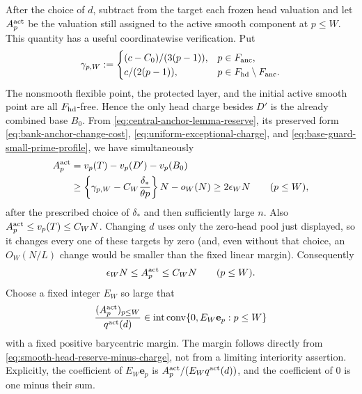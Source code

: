 \documentclass[11pt]{article}
\numberwithin{equation}{section}
\theoremstyle{definition}
\theoremstyle{remark}
\newcommand{\1}{\mathbf 1}
\begin{document}
After the choice of \(d\), subtract from the target each frozen head
valuation and let \(A_p^{\rm act}\) be the valuation still assigned to
the active smooth component at \(p\leq W\).  This quantity has a useful
coordinatewise verification.  Put
\[
 \gamma_{p,W}:=
 \begin{cases}
 (c-C_0)/(3(p-1)),&p\in F_{\rm anc},\\
 c/(2(p-1)),&p\in F_{\rm hd}\setminus F_{\rm anc}.
 \end{cases}
\]
The nonsmooth flexible point, the protected layer, and the initial active
smooth point are all \(F_{\rm hd}\)-free.  Hence the only head charge
besides \(D'\) is the already combined base \(B_0\).  From
\eqref{eq:central-anchor-lemma-reserve}, its preserved form
\eqref{eq:bank-anchor-change-cost},
\eqref{eq:uniform-exceptional-charge}, and
\eqref{eq:base-guard-small-prime-profile}, we have simultaneously
\begin{equation}
 \begin{split}
 A_p^{\rm act}
 &=v_p(T)-v_p(D')-v_p(B_0)\\
 &\geq\left\{\gamma_{p,W}
       -C_W\frac{\delta_*}{\theta p}\right\}N
       -o_W(N)\geq 2\epsilon_WN
       \qquad(p\leq W),
 \end{split}
 \label{eq:smooth-head-reserve-minus-charge}
\end{equation}
after the prescribed choice of \(\delta_*\) and then sufficiently large
\(n\).  Also \(A_p^{\rm act}\leq v_p(T)\leq C_WN\).  Changing \(d\)
uses only the zero-head pool just displayed, so it changes every one of
these targets by zero (and, even without that choice, an
\(O_W(N/L)\) change would be smaller than the fixed linear margin).
Consequently
\begin{equation}
 \epsilon_WN\leq A_p^{\rm act}\leq C_WN
       \qquad(p\leq W).
\label{eq:smooth-head-interior}
\end{equation}
Choose a fixed integer \(E_W\) so large that
\begin{equation}
 \frac{(A_p^{\rm act})_{p\leq W}}{q^{\rm act}(d)}
 \in\operatorname{int}\operatorname{conv}
       \{0,E_W\mathbf e_p:p\leq W\}
\label{eq:smooth-head-simplex}
\end{equation}
with a fixed positive barycentric margin.  The margin follows directly
from \eqref{eq:smooth-head-reserve-minus-charge}, not from a limiting
interiority assertion.  Explicitly, the coefficient
of \(E_W\mathbf e_p\) is
\(A_p^{\rm act}/(E_Wq^{\rm act}(d))\), and the coefficient of \(0\) is
one minus their sum.
\end{document}
